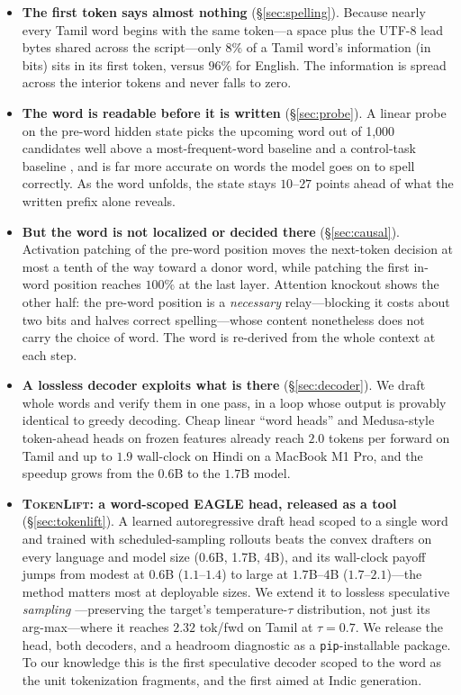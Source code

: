 \begin{itemize}
\item \textbf{The first token says almost nothing} (\S\ref{sec:spelling}).
  Because nearly every Tamil word begins with the same token---a space plus the
  UTF-8 lead bytes shared across the script---only $8\%$ of a Tamil word's
  information (in bits) sits in its first token, versus $96\%$ for English.
  The information is spread across the interior tokens and never falls to zero.
\item \textbf{The word is readable before it is written} (\S\ref{sec:probe}).
  A linear probe on the pre-word hidden state picks the upcoming word out of
  1{,}000 candidates well above a most-frequent-word baseline and a
  control-task baseline \citep{hewitt2019control}, and is far more accurate on
  words the model goes on to spell correctly. As the word unfolds, the state
  stays $10$--$27$ points ahead of what the written prefix alone reveals.
\item \textbf{But the word is not localized or decided there}
  (\S\ref{sec:causal}). Activation patching \citep{meng2022rome,wang2023ioi} of
  the pre-word position moves the next-token decision at most a tenth of the way
  toward a donor word, while patching the first in-word position reaches $100\%$
  at the last layer. Attention knockout shows the other half: the pre-word
  position is a \emph{necessary} relay---blocking it costs about two bits and
  halves correct spelling---whose content nonetheless does not carry the choice
  of word. The word is re-derived from the whole context at each step.
\item \textbf{A lossless decoder exploits what is there}
  (\S\ref{sec:decoder}). We draft whole words and verify them in one pass, in a
  loop whose output is provably identical to greedy decoding. Cheap linear
  ``word heads'' and Medusa-style token-ahead heads
  \citep{cai2024medusa,gloeckle2024multitoken} on frozen features already reach
  $2.0$ tokens per forward on Tamil and up to \x$1.9$ wall-clock on Hindi on a
  MacBook M1 Pro, and the speedup grows from the $0.6$B to the $1.7$B model.
\item \textbf{\textsc{TokenLift}: a word-scoped EAGLE head, released as a tool}
  (\S\ref{sec:tokenlift}). A learned autoregressive draft head
  \citep{li2024eagle} scoped to a single word and trained with
  scheduled-sampling rollouts \citep{bengio2015scheduled} beats the convex
  drafters on every language and model size (0.6B, 1.7B, 4B), and its wall-clock
  payoff jumps from modest at $0.6$B (\x$1.1$--\x$1.4$) to large at $1.7$B--$4$B
  (\x$1.7$--\x$2.1$)---the method matters most at deployable sizes. We extend it
  to lossless speculative \emph{sampling} \citep{leviathan2023fast,
  chen2023accelerating}---preserving the target's temperature-$\tau$
  distribution, not just its arg-max---where it reaches $2.32$ tok/fwd on Tamil
  at $\tau{=}0.7$. We release the head, both decoders, and a headroom diagnostic
  as a \texttt{pip}-installable package. To our knowledge this is the first
  speculative decoder scoped to the word as the unit tokenization fragments, and
  the first aimed at Indic generation.
\end{itemize}

